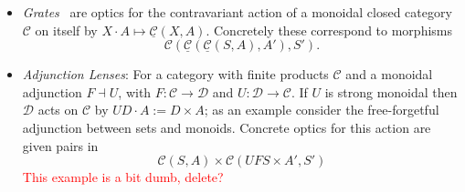 \documentclass[11pt,letterpaper]{article}
\theoremstyle{plain}
\theoremstyle{definition}
\newtheorem{remark}[theorem]{Remark}
\newcommand{\C}{\mathscr{C}}
\newcommand{\homC}{\underline{\C}}
\newcommand{\D}{\mathscr{D}}
\newcommand{\Optic}{\mathbf{Optic}}
\newcommand{\act}{\cdot}
\newcommand{\hto}{\ensuremath{\,\mathaccent\shortmid\rightarrow\,}}
\newcommand{\todo}[1]{\textcolor{red}{\small #1}}
\begin{document}
\begin{itemize}

\item \emph{Grates}~\cite{GratesPost} are optics for the contravariant action of a monoidal closed category $\C$ on itself by $X \cdot A \mapsto \homC(X, A)$. Concretely these correspond to morphisms \[ \C(\homC(\homC(S, A), A'), S'). \]

\item \emph{Adjunction Lenses}: For a category with finite products $\C$ and a monoidal adjunction $F \dashv U$, with $F : \C \to \D$ and $U : \D \to \C$. If $U$ is strong monoidal then $\D$ acts on $\C$ by $UD \act A := D \times A$; as an example consider the free-forgetful adjunction between sets and monoids. Concrete optics for this action are given pairs in
\[ \C(S, A) \times \C(UFS \times A', S') \]
\todo{This example is a bit dumb, delete?}
\end{itemize}
\end{document}
